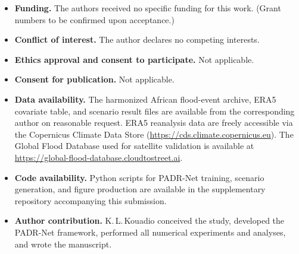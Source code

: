 \documentclass[pdflatex,sn-mathphys-ay]{sn-jnl}
\theoremstyle{thmstyleone}
\theoremstyle{thmstylethree}
\theoremstyle{thmstyletwo}
\begin{document}
\begin{itemize}
\item \textbf{Funding.}
  The authors received no specific funding for this work.
  (Grant numbers to be confirmed upon acceptance.)

\item \textbf{Conflict of interest.}
  The author declares no competing interests.

\item \textbf{Ethics approval and consent to participate.}
  Not applicable.

\item \textbf{Consent for publication.}
  Not applicable.

\item \textbf{Data availability.}
  The harmonized African flood-event archive, ERA5 covariate table,
  and scenario result files are available from the corresponding
  author on reasonable request.  ERA5 reanalysis data are freely
  accessible via the Copernicus Climate Data Store
  (\url{https://cds.climate.copernicus.eu}).  The Global Flood
  Database used for satellite validation is available at
  \url{https://global-flood-database.cloudtostreet.ai}.

\item \textbf{Code availability.}
  Python scripts for PADR-Net training, scenario generation, and
  figure production are available in the supplementary repository
  accompanying this submission.

\item \textbf{Author contribution.}
  K.\,L.\,Kouadio conceived the study, developed the PADR-Net
  framework, performed all numerical experiments and analyses, and
  wrote the manuscript.
\end{itemize}
\end{document}
